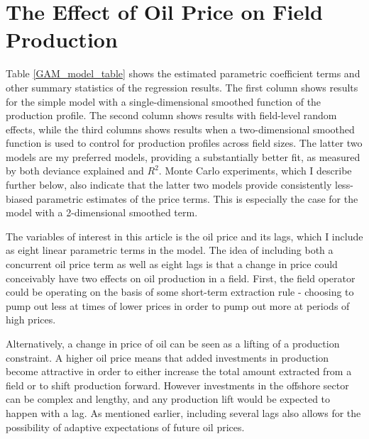 \documentclass[12pt]{article}
\begin{document}
\section{The Effect of Oil Price on Field Production}

Table \ref{GAM_model_table} shows the estimated parametric coefficient terms and other summary statistics of the regression results.  The first column shows results for the simple model with a single-dimensional smoothed function of the production profile.  The second column shows results with field-level random effects, while the third columns shows results when a two-dimensional smoothed function is used to control for production profiles across field sizes. The latter two models are my preferred models, providing a substantially better fit, as measured by both deviance explained and $R^2$. Monte Carlo experiments, which I describe further below, also indicate that the latter two models provide consistently less-biased parametric estimates of the price terms. This is especially the case for the model with a 2-dimensional smoothed term.

The variables of interest in this article is the oil price and its lags, which I include as eight linear parametric terms in the model.  The idea of including both a concurrent oil price term as well as eight lags is that a change in price could conceivably have two effects on oil production in a field.  First, the field operator could be operating on the basis of some short-term extraction rule - choosing to pump out less at times of lower prices in order to pump out more at periods of high prices.  

Alternatively, a change in price of oil can be seen as a lifting of a production constraint.  A higher oil price means that added investments in production become attractive in order to either increase the total amount extracted from a field or to shift production forward.  However investments in the offshore sector can be complex and lengthy, and any production lift would be expected to happen with a lag.  As mentioned earlier, including several lags also allows for the possibility of adaptive expectations of future oil prices.  
\end{document}
